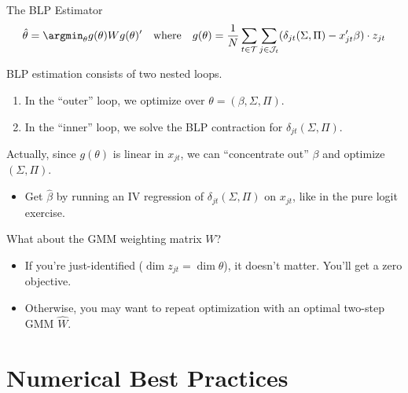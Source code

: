 \documentclass[aspectratio=169,t,11pt,table]{beamer}
\begin{document}
\begin{frame}{The BLP Estimator}
     \vspace{-\baselineskip}
    \begin{equation*}
        \hat{\theta} = \argmin_\theta g(\theta) W g(\theta)' \quad\text{where}\quad g(\theta) = \frac{1}{N} \sum_{t \in \mathcal{T}} \sum_{j \in \mathcal{J}_t} (\delta_{jt}(\Sigma, \Pi) - x_{jt}'\beta) \cdot z_{jt}
    \end{equation*}
     \vspace{-0.5\baselineskip}
    \begin{wideitemize}
        \item BLP estimation consists of two nested loops.
        \begin{enumerate}
            \item In the ``outer'' loop, we optimize over $\theta = (\beta, \Sigma, \Pi)$.
            \item In the ``inner'' loop, we solve the BLP contraction for $\delta_{jt}(\Sigma, \Pi)$.
        \end{enumerate}
        \pause
        \item Actually, since $g(\theta)$ is linear in $x_{jt}$, we can ``concentrate out'' $\beta$ and optimize $(\Sigma, \Pi)$.
        \begin{itemize}
            \item Get $\hat{\beta}$ by running an IV regression of $\delta_{jt}(\Sigma, \Pi)$ on $x_{jt}$, like in the pure logit exercise.
        \end{itemize}
        \pause
        \item What about the GMM weighting matrix $W$?
        \begin{itemize}
            \item If you're just-identified ($\dim z_{jt} = \dim \theta$), it doesn't matter. You'll get a zero objective.
            \item Otherwise, you may want to repeat optimization with an optimal two-step GMM $\hat{W}$.
        \end{itemize}
    \end{wideitemize}
\end{frame}

\section{Numerical Best Practices}
\end{document}
